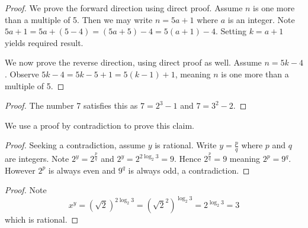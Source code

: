 \begin{questions}
    
    \item \begin{proof}
        We prove the forward direction using direct proof. Assume $n$ is one more than a multiple of 5. Then we may write $n = 5a + 1$ where $a$ is an integer. Note $5a + 1 = 5a + (5 - 4) = (5a + 5) - 4 = 5(a+1) - 4$. Setting $k = a+1$ yields required result.
    
        We now prove the reverse direction, using direct proof as well. Assume $n = 5k - 4$. Observe $5k - 4 = 5k - 5 + 1 = 5(k-1) + 1$, meaning $n$ is one more than a multiple of 5.
    \end{proof}
    
    \item \begin{proof}
        The number 7 satisfies this as $7 = 2^3 - 1$ and $7 = 3^2 - 2$.
    \end{proof}
    
    \item \begin{partquestions}{\roman*}
        \item We use a proof by contradiction to prove this claim.
        
        \begin{proof}
            Seeking a contradiction, assume $y$ is rational. Write $y = \frac pq$ where $p$ and $q$ are integers. Note $2^y = 2^{\frac pq}$ and $2^y = 2^{2\log_2{3}} = 9$. Hence $2^{\frac pq} = 9$ meaning $2^p = 9^q$. However $2^p$ is always even and $9^q$ is always odd, a contradiction.
        \end{proof}

        \item \begin{proof}
            Note
            \[
                x^y = (\sqrt2)^{2\log_2{3}} = \left(\sqrt{2}^2\right)^{\log_2{3}} = 2^{\log_2{3}} = 3        
            \]
            which is rational.
        \end{proof}
    \end{partquestions}
\end{questions}
